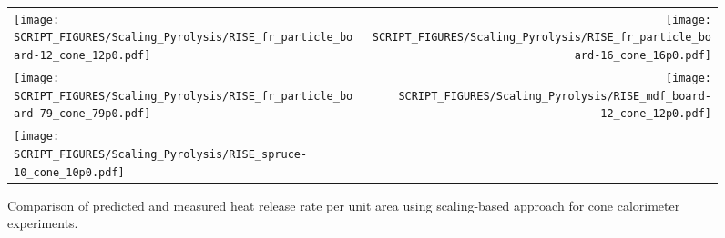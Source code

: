 \begin{figure}[p]
\begin{tabular*}{\textwidth}{l@{\extracolsep{\fill}}r}
\texttt{[image: SCRIPT\_FIGURES/Scaling\_Pyrolysis/RISE\_fr\_particle\_board-12\_cone\_12p0.pdf]} &
\texttt{[image: SCRIPT\_FIGURES/Scaling\_Pyrolysis/RISE\_fr\_particle\_board-16\_cone\_16p0.pdf]} \\
\texttt{[image: SCRIPT\_FIGURES/Scaling\_Pyrolysis/RISE\_fr\_particle\_board-79\_cone\_79p0.pdf]} &
\texttt{[image: SCRIPT\_FIGURES/Scaling\_Pyrolysis/RISE\_mdf\_board-12\_cone\_12p0.pdf]} \\
\texttt{[image: SCRIPT\_FIGURES/Scaling\_Pyrolysis/RISE\_spruce-10\_cone\_10p0.pdf]} &
\end{tabular*}
\caption[HRRPUA of RISE Materials using scaling model , Wood-Based materials]
{Comparison of predicted and measured heat release rate per unit area using scaling-based approach for cone calorimeter experiments.}
\label{RISE_Materials_HRR_Wood-Based}
\end{figure}


